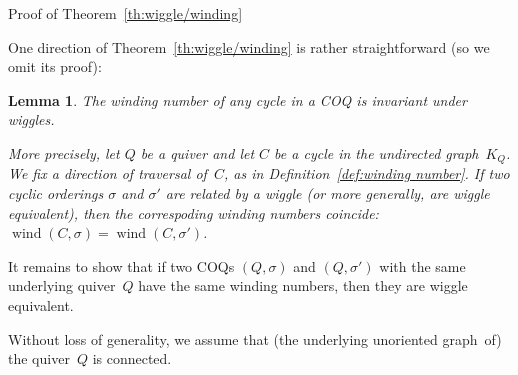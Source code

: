\documentclass[11pt, letterpaper]{amsart}
\newcommand{\cS}[1]{{\noindent\textsf{\color{purple}$\blacksquare$~#1~$\blacksquare$}}}
\newtheorem{lemma}[theorem]{Lemma}
\theoremstyle{definition}
\numberwithin{equation}{section}
\def\wind{{\operatorname{wind}}}
\begin{document}
\centerline{\sc Proof of Theorem~\ref{th:wiggle/winding}}

\medskip

One direction of Theorem~\ref{th:wiggle/winding} is rather straightforward (so we omit its proof):   

\begin{lemma}
\label{lem:winding number invariant}
The winding number of any cycle in a COQ is invariant under wiggles.

More precisely, let $Q$ be a quiver and let $C$ be a cycle in the undirected graph~$K_Q$.
We fix a direction of traversal of~$C$, as in Definition~\ref{def:winding number}. 
If two cyclic orderings $\sigma$ and $\sigma'$ are related by a wiggle (or more generally, are wiggle equivalent), 
then the correspoding winding numbers coincide: $\wind(C,\sigma)=\wind(C,\sigma')$. 
\end{lemma}

It remains to show that if two COQs $(Q, \sigma)$ and $(Q, \sigma')$ with the same underlying quiver~$Q$ 
have the same winding numbers, then they are wiggle equivalent. 

Without loss of generality, we assume that (the underlying unoriented graph~of) the quiver~$Q$ is connected. 
\end{document}
